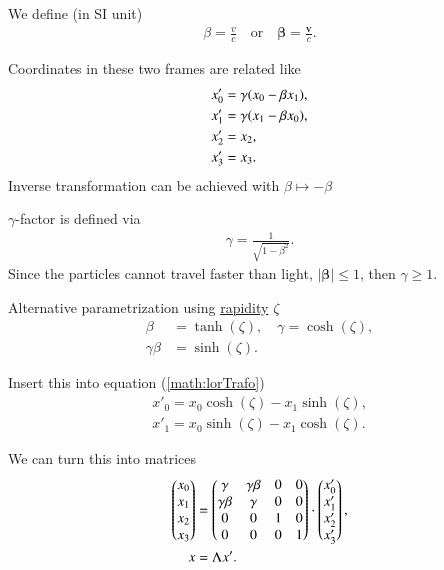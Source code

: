 We define (in SI unit)
\begin{align}
   \beta = \frac{v}{c} \quad \text{or} \quad
   \pmb{\beta} = \frac{\pmb{v}}{c}.
\end{align}

Coordinates in these two frames are related like
\begin{align*}
   x'_0 &= \gamma(x_0 - \beta x_1), \\
   x'_1 &= \gamma (x_1 - \beta x_0), \notag \\
   x'_2 &= x_2, \notag \\
   x'_3 &= x_3. \notag \label{math:lorTrafo}
\end{align*}
Inverse transformation can be achieved with $\beta \mapsto -\beta$

$\gamma$-factor is defined via
\begin{align}
   \gamma = \frac{1}{\sqrt{1-{\beta}^2}}.
\end{align}
Since the particles cannot travel faster than light, $|\pmb{\beta}| \leq 1$, then $\gamma \geq 1$.

Alternative parametrization using \underline{rapidity} $\zeta$
\begin{align*}
   \beta &= \tanh(\zeta), \quad \gamma = \cosh(\zeta), \\
   \gamma \beta &= \sinh(\zeta).
\end{align*}

Insert this into equation (\ref{math:lorTrafo})
\begin{align*}
   x'_0 = x_0 \cosh(\zeta) - x_1 \sinh(\zeta), \\
   x'_1 = x_0 \sinh(\zeta) - x_1 \cosh(\zeta).
\end{align*}

We can turn this into matrices
\begin{align}
   \begin{pmatrix} x_0 \\ x_1 \\ x_2 \\ x_3\end{pmatrix}
   &=
   \begin{pmatrix} \gamma & \gamma\beta & 0 & 0 \\ \gamma\beta & \gamma & 0 & 0 \\ 0 & 0 & 1 & 0 \\ 0 & 0 & 0 & 1\end{pmatrix}
   \cdot
   \begin{pmatrix} x'_0\\ x'_1 \\ x'_2 \\ x'_3\end{pmatrix}, \notag \\
   x &= \Lambda x'.
\end{align}

